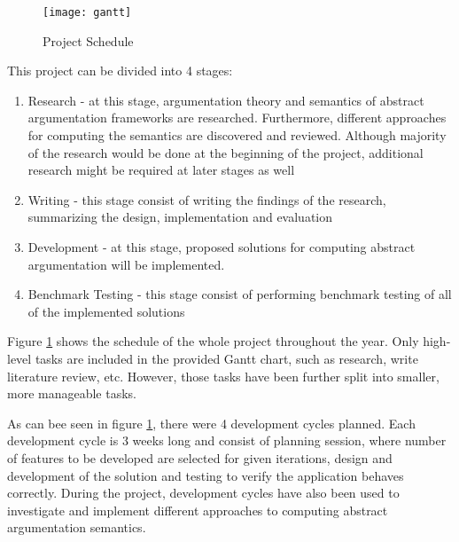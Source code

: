 \begin{landscape}
	\centering
	\begin{figure}[]
		\texttt{[image: gantt]}
		\caption{Project Schedule}
		\label{fig:projectSchedule}
	\end{figure}
\end{landscape}

This project can be divided into 4 stages:
\begin{enumerate}
	\item Research - at this stage, argumentation theory and semantics of abstract argumentation frameworks are researched. Furthermore, different approaches for computing the semantics are discovered and reviewed. Although majority of the research would be done at the beginning of the project, additional research might be required at later stages as well
	\item Writing - this stage consist of writing the findings of the research, summarizing the design, implementation and evaluation
	\item Development - at this stage, proposed solutions for computing abstract argumentation will be implemented. 
	\item Benchmark Testing - this stage consist of performing benchmark testing of all of the implemented solutions
\end{enumerate}

Figure \ref{fig:projectSchedule} shows the schedule of the whole project throughout the year. Only high-level tasks are included in the provided Gantt chart, such as research, write literature review, etc. However, those tasks have been further split into smaller, more manageable tasks.  


As can bee seen in figure \ref{fig:projectSchedule}, there were 4 development cycles planned. Each development cycle is 3 weeks long and consist of planning session, where number of features to be developed are selected for given iterations, design and development of the solution and testing to verify the application behaves correctly. During the project, development cycles have also been used to investigate and implement different approaches to computing abstract argumentation semantics.
